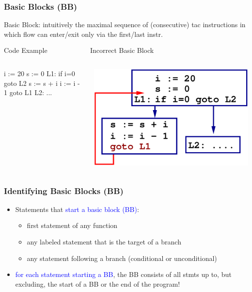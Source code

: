 \documentclass{beamer}
\newcommand{\blue}[1]{\textcolor{Blue}{{#1}}}
\newcommand{\emp}[1]{\textcolor{DikuRed}{ #1}}
\begin{document}
\begin{frame}[fragile,t]
    \frametitle{Basic Blocks (BB)}

Basic Block: intuitively the maximal sequence of (consecutive) {\sc tac} 
                instructions in which flow can enter/exit only via 
                the first/last instr.

\bigskip

\begin{block}{Code Example $\mbox{~~~~~~~~~~~~~~~~~}$ Incorrect Basic Block}
\begin{columns}
\begin{colorcode}[fontsize=\scriptsize]
    i := 20
    s := 0
L1: if i=0 \emp{goto L2}
    s := s + i
    i := i - 1
    \emp{goto L1}
L2: ...
\end{colorcode}
\includegraphics[width=20ex]{Figures/CFGwrong}
\end{columns} 
\end{block}

\end{frame}


\begin{frame}[fragile,t]
    \frametitle{Identifying Basic Blocks (BB)}

\begin{itemize}
\item Statements that \blue{start a basic block (BB)}:
    \begin{itemize}
        \item first statement of any function

        \item any labeled statement that is the target of a branch

        \item any statement following a branch (conditional or unconditional)\smallskip
    \end{itemize}

\item \blue{for each statement starting a BB}, the BB consists of all stmts up
            to, but excluding, the start of a BB or the end of the program!
\end{itemize}
\end{frame}
\end{document}
